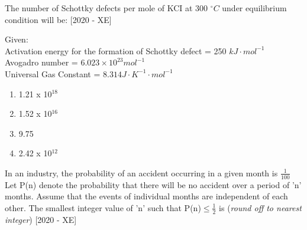     \item The number of Schottky defects per mole of KCI at 300 $^\circ C$ under equilibrium condition will be: \hfill{[2020 - XE]}
    
    Given:\\
    Activation energy for the formation of Schottky defect = 250 $kJ\cdot mol^{-1}$\\
    Avogadro number =  $6.023 \times 10^{23} mol^{-1}$\\
    Universal Gas Constant = $8.314 J\cdot K^{-1}\cdot mol^{-1}$
    \begin{enumerate}
        \item 1.21 x 10$^{18}$
        \item 1.52 x 10$^{16}$
        \item 9.75
        \item 2.42 x 10$^{12}$
    \end{enumerate}
    
    \item In an industry, the probability of an accident occurring in a given month is $\frac{1}{100}$ Let P(n) denote the probability that there will be no accident over a period of 'n' months. Assume that the events of individual months are independent of each other. The smallest integer value of 'n' such that P(n)$\leq \frac{1}{2}$ is \underline{\hspace{3cm}} (\textit{round off to nearest integer}) \hfill{[2020 - XE]}
    
